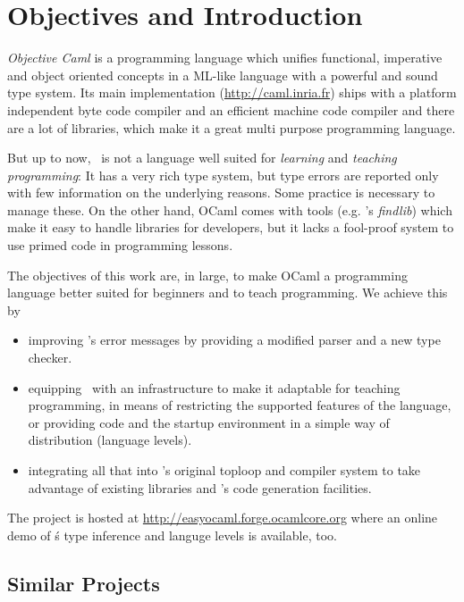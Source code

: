 
\section{Objectives and Introduction}
\label{sec:intro}

\label{hd001}
\textsl{Objective Caml} \citep{leroy2008} is a programming language which unifies 
functional, imperative and object oriented concepts in a ML-like 
language with a powerful and sound type system.  Its main implementation 
(\url{http://caml.inria.fr}) ships with a platform independent byte code
compiler and an efficient machine code compiler and there are a lot of
libraries, which make it a great multi purpose programming language.

But up to now, \ocaml\ is not a language well suited for \emph{learning} and
\emph{teaching programming}:
It has a very rich type system, but type errors are reported only with few
information on the underlying reasons.
Some practice is necessary to manage these.
On the other hand, OCaml comes with tools (e.g.  \citeauthor{stolpmann}'s
\emph{findlib}) which make it easy to handle libraries for developers, but it
lacks a fool-proof system to use primed code in programming lessons.

The objectives of this work are, in large, to make OCaml a
programming language better suited for beginners and to teach programming. We
achieve this by

\begin{itemize}
    \item improving \ocaml's error messages by providing a modified 
        parser and a new type checker.
    \item equipping \ocaml\ with an infrastructure to make it 
        adaptable for teaching programming, in means of restricting the 
        supported features of the language, or providing code and the 
        startup environment in a simple way of distribution (language 
        levels).
    \item integrating all that into \ocaml's original toploop and 
        compiler system to take advantage of existing libraries and 
        \ocaml's code generation facilities.
\end{itemize}
The project is hosted at
\url{http://easyocaml.forge.ocamlcore.org}  where an online demo of \easyocaml\'s
type inference and languge levels is available, too.

\subsection{Similar Projects}

